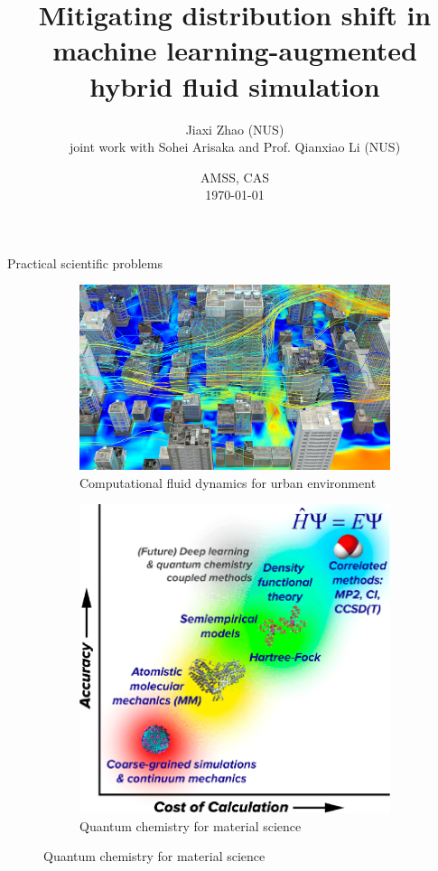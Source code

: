 \documentclass[paper slide]{beamer}
\title[Mitigating DS in SciML]{Mitigating distribution shift in machine learning-augmented hybrid fluid simulation}%
\author[J. Zhao]{Jiaxi Zhao (NUS) \\ \small joint work with Sohei Arisaka and Prof. Qianxiao Li (NUS)}
\date[\today]{AMSS, CAS \\ \today}
\begin{document}
\par \setlength{\parindent}{2em}

\begin{frame}
\titlepage
\end{frame}


\begin{frame}{Practical scientific problems}
	\begin{figure}[ht]
		\centering
		\begin{subfigure}{0.5\linewidth} %
			\centering
			\includegraphics[width=\linewidth]{fig/urban_environment.jpeg}
			\caption{Computational fluid dynamics for urban environment}
		  \end{subfigure}%
		  \begin{subfigure}{0.5\linewidth} %
			\centering
			\includegraphics[width=\linewidth]{fig/quantum_chemisty.png}
			\caption{Quantum chemistry for material science}
		  \end{subfigure}
	\end{figure}
\end{frame}
\end{document}
